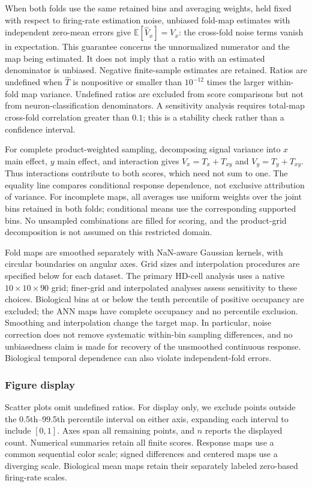 \documentclass[11pt]{article}
\begin{document}
When both folds use the same retained bins and averaging weights, held fixed with respect to firing-rate estimation noise, unbiased fold-map estimates with independent zero-mean errors give $\mathbb{E}[\widehat V_x]=V_x$: the cross-fold noise terms vanish in expectation. This guarantee concerns the unnormalized numerator and the map being estimated. It does not imply that a ratio with an estimated denominator is unbiased. Negative finite-sample estimates are retained. Ratios are undefined when $\widehat T$ is nonpositive or smaller than $10^{-12}$ times the larger within-fold map variance. Undefined ratios are excluded from score comparisons but not from neuron-classification denominators. A sensitivity analysis requires total-map cross-fold correlation greater than $0.1$; this is a stability check rather than a confidence interval.

For complete product-weighted sampling, decomposing signal variance into $x$ main effect, $y$ main effect, and interaction gives $V_x=T_x+T_{xy}$ and $V_y=T_y+T_{xy}$. Thus interactions contribute to both scores, which need not sum to one. The equality line compares conditional response dependence, not exclusive attribution of variance. For incomplete maps, all averages use uniform weights over the joint bins retained in both folds; conditional means use the corresponding supported bins. No unsampled combinations are filled for scoring, and the product-grid decomposition is not assumed on this restricted domain.

Fold maps are smoothed separately with NaN-aware Gaussian kernels, with circular boundaries on angular axes. Grid sizes and interpolation procedures are specified below for each dataset. The primary HD-cell analysis uses a native $10\times10\times90$ grid; finer-grid and interpolated analyses assess sensitivity to these choices. Biological bins at or below the tenth percentile of positive occupancy are excluded; the ANN maps have complete occupancy and no percentile exclusion. Smoothing and interpolation change the target map. In particular, noise correction does not remove systematic within-bin sampling differences, and no unbiasedness claim is made for recovery of the unsmoothed continuous response. Biological temporal dependence can also violate independent-fold errors.

\subsubsection*{Figure display}
Scatter plots omit undefined ratios. For display only, we exclude points outside the 0.5th--99.5th percentile interval on either axis, expanding each interval to include $[0,1]$. Axes span all remaining points, and $n$ reports the displayed count. Numerical summaries retain all finite scores. Response maps use a common sequential color scale; signed differences and centered maps use a diverging scale. Biological mean maps retain their separately labeled zero-based firing-rate scales.
\end{document}
